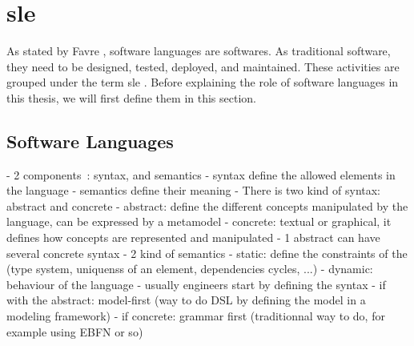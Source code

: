 \section[Software Language Engineering]{\glsdesc{sle}}

As stated by Favre \etal \cite{DBLP:conf/sle/FavreGLP10}, software languages are softwares.
As traditional software, they need to be designed, tested, deployed, and maintained.
These activities are grouped under the term \gls{sle} \cite{kleppe2008software}.
Before explaining the role of software languages in this thesis, we will first define them in this section.

\subsection{Software Languages}


	
- 2 components~\cite{DBLP:journals/computer/HarelR04}: syntax, and semantics
- syntax define the allowed elements in the language
- semantics define their meaning
- There is two kind of syntax: abstract and concrete
	- abstract: define the different concepts manipulated by the language, can be expressed by a metamodel
	- concrete: textual or graphical, it defines how concepts are represented and manipulated
	- 1 abstract can have several concrete syntax
- 2 kind of semantics
	- static: define the constraints of the (type system, uniquenss of an element, dependencies cycles, ...)
	- dynamic: behaviour of the language
- usually engineers start by defining the syntax
	- if with the abstract: model-first (way to do DSL by defining the model in a modeling framework)
	- if concrete: grammar first (traditionnal way to do, for example using EBFN or so) 
	
